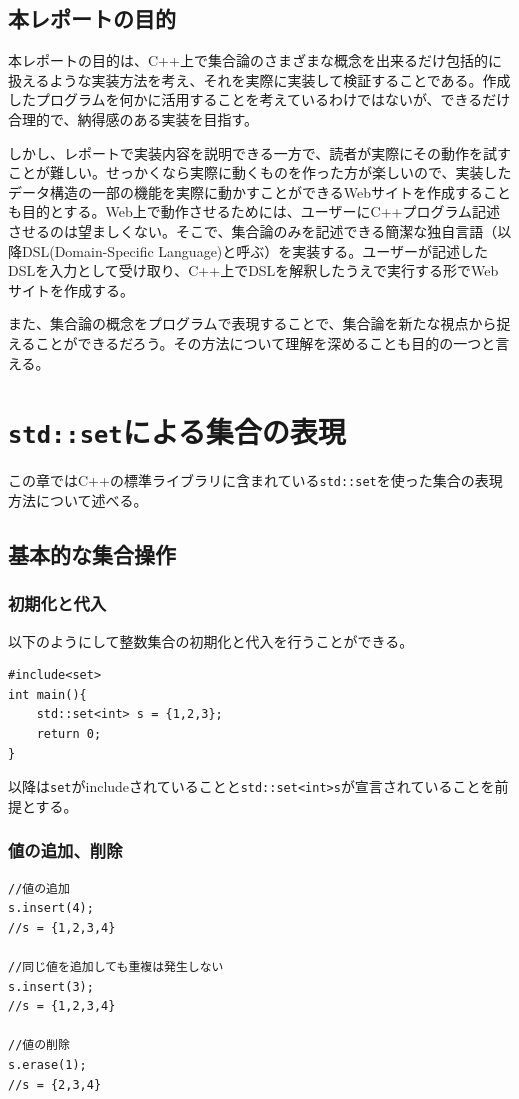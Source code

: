 \documentclass[a4paper,11pt]{ltjsarticle}
\begin{document}
\subsection{本レポートの目的}
本レポートの目的は、C++上で集合論のさまざまな概念を出来るだけ包括的に扱えるような実装方法を考え、それを実際に実装して検証することである。作成したプログラムを何かに活用することを考えているわけではないが、できるだけ合理的で、納得感のある実装を目指す。

しかし、レポートで実装内容を説明できる一方で、読者が実際にその動作を試すことが難しい。せっかくなら実際に動くものを作った方が楽しいので、実装したデータ構造の一部の機能を実際に動かすことができるWebサイトを作成することも目的とする。Web上で動作させるためには、ユーザーにC++プログラム記述させるのは望ましくない。そこで、集合論のみを記述できる簡潔な独自言語（以降DSL(Domain-Specific Language)と呼ぶ）を実装する。ユーザーが記述したDSLを入力として受け取り、C++上でDSLを解釈したうえで実行する形でWebサイトを作成する。

また、集合論の概念をプログラムで表現することで、集合論を新たな視点から捉えることができるだろう。その方法について理解を深めることも目的の一つと言える。

\section{\texttt{std::set}による集合の表現}
この章ではC++の標準ライブラリに含まれている\texttt{std::set}を使った集合の表現方法について述べる。
\subsection{基本的な集合操作}
\subsubsection{初期化と代入}
以下のようにして整数集合の初期化と代入を行うことができる。
\begin{lstlisting}
#include<set>
int main(){
    std::set<int> s = {1,2,3};
    return 0;
}
\end{lstlisting}
以降は\lstinline|set|がincludeされていることと\lstinline|std::set<int>s|が宣言されていることを前提とする。
\subsubsection{値の追加、削除}
\begin{lstlisting}
//値の追加
s.insert(4);
//s = {1,2,3,4}

//同じ値を追加しても重複は発生しない
s.insert(3);
//s = {1,2,3,4}

//値の削除
s.erase(1);
//s = {2,3,4}
\end{lstlisting}
\end{document}
